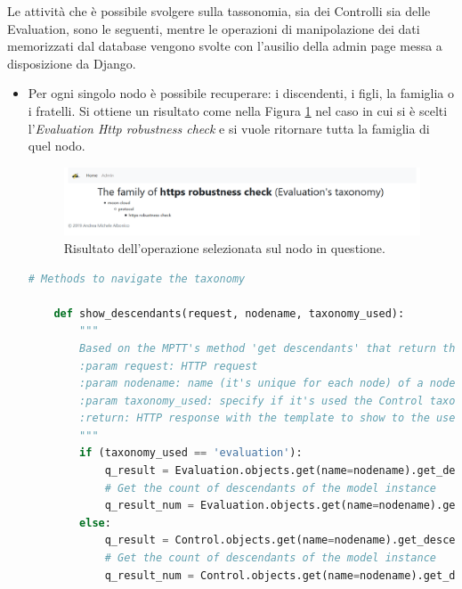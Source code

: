 %
Le attività che è possibile svolgere sulla tassonomia, sia dei Controlli sia delle Evaluation, sono le seguenti, mentre le operazioni 
di manipolazione dei dati memorizzati dal database vengono svolte con l'ausilio della admin page messa a disposizione da Django.\hfill\break
\begin{itemize}
    \item Per ogni singolo nodo è possibile recuperare: i discendenti, i figli, la famiglia o i fratelli. Si ottiene un risultato come nella 
    Figura \ref{fig:MCRS_taxnodedetails} nel caso in cui si è scelti l'\textit{Evaluation Http robustness check} e si vuole ritornare tutta la 
    famiglia di quel nodo.
    \begin{figure}[ht!]
        \includegraphics[scale=0.3]{images/MCRS_taxnodedetails.png}
        \caption{Risultato dell'operazione selezionata sul nodo in questione.}
        \label{fig:MCRS_taxnodedetails}
    \end{figure}
    \lstset{style=python_code_style}
    \begin{lstlisting}[language=Python, label=lst:view_tax_nodedetails, caption={Codice utilizzato all'interno delle View per 
        implementare le operazioni per restituire i discendenti, i figli, la famiglia o i fratelli.}]
    # Methods to navigate the taxonomy
 
    def show_descendants(request, nodename, taxonomy_used):
        """
        Based on the MPTT's method 'get descendants' that return the descendants of a model instance, in tree order
        :param request: HTTP request
        :param nodename: name (it's unique for each node) of a node in the taxonomy
        :param taxonomy_used: specify if it's used the Control taxonomy or the Evaluation taxonomy
        :return: HTTP response with the template to show to the user
        """
        if (taxonomy_used == 'evaluation'):
            q_result = Evaluation.objects.get(name=nodename).get_descendants(include_self=False)
            # Get the count of descendants of the model instance
            q_result_num = Evaluation.objects.get(name=nodename).get_descendant_count()
        else:
            q_result = Control.objects.get(name=nodename).get_descendants(include_self=False)
            # Get the count of descendants of the model instance
            q_result_num = Control.objects.get(name=nodename).get_descendant_count()
 

\end{lstlisting}
\end{itemize}
